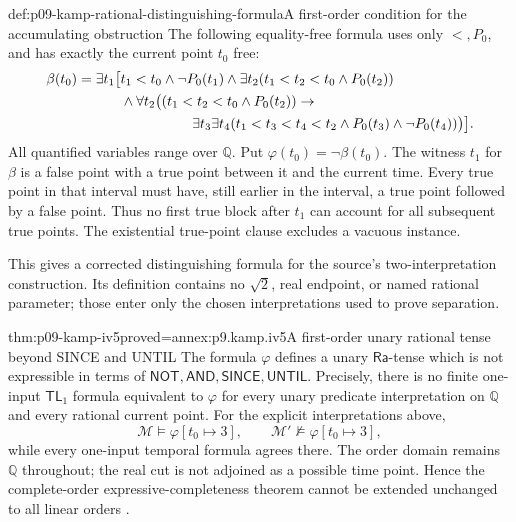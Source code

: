 \begin{hbdefinition}{def:p09-kamp-rational-distinguishing-formula}{A first-order condition for the accumulating obstruction}
The following equality-free formula uses only \(<,P_0\), and
has exactly the current point \(t_0\) free:
\[
\begin{aligned}
 \beta(t_0)=\exists t_1\bigl[&t_1<t_0\land\neg P_0(t_1)\land
           \exists t_2(t_1<t_2<t_0\land P_0(t_2))\\
 &\land\forall t_2\bigl((t_1<t_2<t_0\land P_0(t_2))\to\\
 &\hspace{18mm}\exists t_3\exists t_4
      (t_1<t_3<t_4<t_2\land P_0(t_3)\land\neg P_0(t_4))\bigr)
 \bigr].
\end{aligned}
\]
All quantified variables range over \(\mathbb Q\). Put
\(\varphi(t_0)=\neg\beta(t_0)\).
The witness \(t_1\) for \(\beta\) is a false point with
a true point between it and the current time. Every true point
in that interval must have, still earlier in the interval, a
true point followed by a false point. Thus no first true block
after \(t_1\) can account for all subsequent true points.
The existential true-point clause excludes a vacuous instance.

This gives a corrected distinguishing formula for the source's
two-interpretation construction. Its definition contains no
\(\sqrt2\), real endpoint, or named rational parameter;
those enter only the chosen interpretations used to prove separation.
\end{hbdefinition}

\begin{hbtheorem}{thm:p09-kamp-iv5}{proved=annex:p9.kamp.iv5}{A first-order unary rational tense beyond SINCE and UNTIL}
The formula \(\varphi\) defines a unary
\(\mathsf{Ra}\)-tense which is not expressible in terms of
\(\mathsf{NOT},\mathsf{AND},\mathsf{SINCE},\mathsf{UNTIL}\).
Precisely, there is no finite one-input \(\mathsf{TL}_1\)
formula equivalent to \(\varphi\) for every unary predicate
interpretation on \(\mathbb Q\) and every rational current point.
For the explicit interpretations above,
\[
                     \mathcal M\models\varphi[t_0\mapsto3],
            \qquad \mathcal M'\not\models\varphi[t_0\mapsto3],
\]
while every one-input temporal formula agrees there. The order
domain remains \(\mathbb Q\) throughout; the real cut is not
adjoined as a possible time point. Hence the complete-order
expressive-completeness theorem cannot be extended unchanged to
all linear orders
\cite[ch.~IV, thm.~5, pp.~109--112]{Kamp1968}.
\end{hbtheorem}

